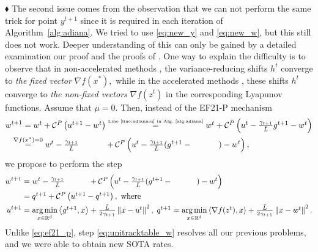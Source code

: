 \documentclass{article} %
\newcommand{\norm}[1]{\left\| #1 \right\|}
\newcommand{\inp}[2]{\left\langle#1,#2\right\rangle} %
\newcommand{\R}{\mathbb{R}} %
\newcommand{\cC}{\mathcal{C}}
\theoremstyle{plain}
\theoremstyle{definition}
\theoremstyle{remark}
\DeclareMathOperator*{\argmin}{arg\,min}%
\newcommand{\squeeze}{\textstyle}
\newcommand{\green}{\color{mydarkgreen}}
\newcommand{\red}{\color{mydarkred}}
\newcommand{\algname}[1]{{\small\green\sf #1}}
\begin{document}
$\blacklozenge$ The second issue comes from the observation that we can not perform the same trick for point $y^{t+1}$ since it is required in each iteration of Algorithm~\ref{alg:adiana}. We tried to use \eqref{eq:new_y} and \eqref{eq:new_w}, but this still does not work. Deeper understanding of this can only be gained by a detailed examination our proof and the proofs of \citep{ADIANA,gruntkowska2022ef21}. One  way to explain the difficulty is to observe that in non-accelerated methods \citep{gorbunov2020unified,gruntkowska2022ef21}, the variance-reducing shifts $h^t$ converge to \emph{the fixed vector} $\nabla f(x^*),$ while in the accelerated methods \citep{ADIANA, li2021canita}, these shifts $h^t$ converge to \emph{the non-fixed vectors} $\nabla f(z^t)$ in the corresponding Lyapunov functions. Assume that $\mu = 0.$ Then, instead of the \algname{EF21-P} mechanism
\begin{eqnarray}
\begin{aligned}
  \label{eq:ef21_p}
  w^{t+1} &\squeeze = w^t + \cC^{P}\left(u^{t+1} - w^t\right) \overset{\textnormal{\tiny Line~\ref{line:adiana:u} in Alg.~\ref{alg:adiana}}}{=} w^t + \cC^{P}\left(u^{t} - \frac{\gamma_{t+1}}{\bar{L}} g^{t+1} - w^t\right) \\
  &\squeeze \hspace{-0.5cm}\overset{\nabla f(x^*) = 0}{=} w^t - \frac{\gamma_{t+1}}{\bar{L}} {\red \nabla f(x^*)} + \cC^{P}\left(u^{t} - \frac{\gamma_{t+1}}{\bar{L}} (g^{t+1} - {\red \nabla f(x^*)}) - w^t\right),
\end{aligned}
\end{eqnarray}
we propose to perform the step
\begin{align}
  w^{t+1} &\squeeze= w^t - \frac{\gamma_{t+1}}{\bar{L}} {\green \nabla f(z^t)} + \cC^{P}\left(u^{t} - \frac{\gamma_{t+1}}{\bar{L}} (g^{t+1} - {\green \nabla f(z^t)}) - w^t\right)
  \label{eq:unitracktable_w} \\
  &\squeeze = q^{t+1} + \cC^{P}\left(u^{t+1} - q^{t+1}\right) \nonumber, \textnormal{ where}\\
   u^{t+1} &\squeeze= \argmin \limits_{x \in \R^d} \inp{g^{t+1}}{x} + \frac{\bar{L}}{2 \gamma_{t+1}} \norm{x - u^t}^2, \; q^{t+1}   = \argmin \limits_{x \in \R^d} \inp{\nabla f(z^t)}{x} + \frac{\bar{L}}{2 \gamma_{t+1}} \norm{x - w^t}^2. \nonumber
\end{align}
Unlike \eqref{eq:ef21_p},  step \eqref{eq:unitracktable_w} resolves all our previous problems, and we were able to obtain new SOTA  rates.
\end{document}
